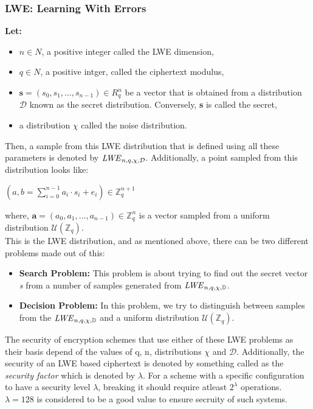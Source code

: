 \documentclass{report}
\begin{document}
\subsubsection{LWE: Learning With Errors}
\textbf{Let:}\\
\begin{itemize}
	\item $n \in N$, a positive integer called the LWE dimension,
	\item $q \in N$, a positive intger, called the ciphertext modulus,
	\item $\textbf{s} = (s_0, s_1, ..., s_{n-1}) \in R_q^n$ be a vector that is obtained from a distribution $\mathcal{D}$ known as the secret distribution. Conversely, \textbf{s} is called the secret, \footnotemark{}
	\item a distribution $\chi$ called the noise distribution.
\end{itemize}
Then, a sample from this LWE distribution that is defined using all these parameters is denoted by $\text{\textit{LWE}}_{n, q, \chi, \mathcal{D}}$. Additionally, a point sampled from this distribution looks like:
\begin{center}
	$(a, b = \sum\limits_{i=0}^{n-1}a_i \cdot s_i + e_i) \in \mathbb{Z}_q^{n+1}$
\end{center}
where, $\textbf{a} = (a_0, a_1, ..., a_{n-1}) \in \mathbb{Z}_q^n$ is a vector sampled from a uniform distribution $\mathcal{U}(\mathbb{Z}_q)$\footnotemark[\value{footnote}].\\
This is the LWE distribution, and as mentioned above, there can be two different problems made out of this:
\begin{itemize}
	\item \textbf{Search Problem:} This problem is about trying to find out the secret vector \textit{s} from a number of samples generated from $\text{\textit{LWE}}_{n, q, \chi, \mathbb{D}}$.
	\item \textbf{Decision Problem:} In this problem, we try to distinguish between samples from the $\text{\textit{LWE}}_{n, q, \chi, \mathbb{D}}$ and a uniform distribution $\mathcal{U}(\mathbb{Z}_q)$.
\end{itemize}

The security of encryption schemes that use either of these LWE problems as their basis depend of the values of q, n, distributions $\chi$ and $\mathcal{D}$. Additionally, the security of an LWE based ciphertext is denoted by something called as the \textit{security factor} which is denoted by $\lambda$. For a scheme with a specific configuration to have a security level $\lambda$, breaking it should require atleast $2^\lambda$ operations. $\lambda = 128$ is considered to be a good value to ensure secruity of such systems. \vspace{5em}
\end{document}
